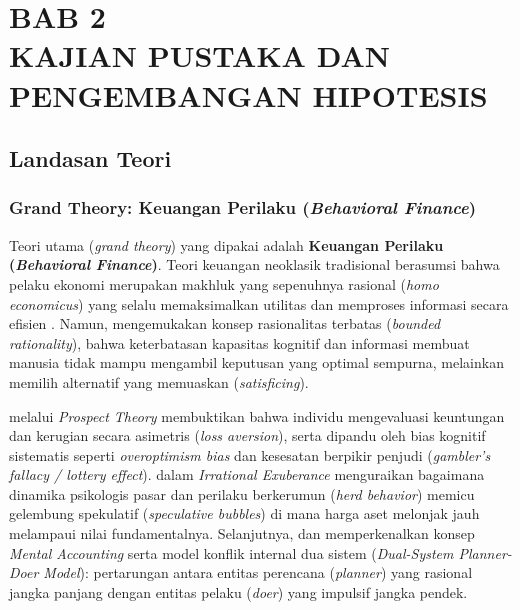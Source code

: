 \documentclass[12pt,a4paper]{article}
\numberwithin{equation}{section}
\numberwithin{table}{section}
\numberwithin{figure}{section}
\begin{document}
\newpage
\setcounter{section}{1}
\section*{BAB 2\\[0.3cm]KAJIAN PUSTAKA DAN PENGEMBANGAN HIPOTESIS}
\setcounter{section}{2}
\setcounter{subsection}{0}
\setcounter{table}{0}
\setcounter{figure}{0}
\setcounter{equation}{0}

\subsection{Landasan Teori}

\subsubsection{Grand Theory: Keuangan Perilaku (\emph{Behavioral Finance})}

Teori utama (\emph{grand theory}) yang dipakai adalah \textbf{Keuangan Perilaku (\emph{Behavioral Finance})}. Teori keuangan neoklasik tradisional berasumsi bahwa pelaku ekonomi merupakan makhluk yang sepenuhnya rasional (\emph{homo economicus}) yang selalu memaksimalkan utilitas dan memproses informasi secara efisien \citep{fama1970efficient}. Namun, \citet{simon1955behavioral} mengemukakan konsep rasionalitas terbatas (\emph{bounded rationality}), bahwa keterbatasan kapasitas kognitif dan informasi membuat manusia tidak mampu mengambil keputusan yang optimal sempurna, melainkan memilih alternatif yang memuaskan (\emph{satisficing}).

\citet{kahneman1979prospect} melalui \emph{Prospect Theory} membuktikan bahwa individu mengevaluasi keuntungan dan kerugian secara asimetris (\emph{loss aversion}), serta dipandu oleh bias kognitif sistematis seperti \emph{overoptimism bias} dan kesesatan berpikir penjudi (\emph{gambler's fallacy / lottery effect}). \citet{shiller2000irrational} dalam \emph{Irrational Exuberance} menguraikan bagaimana dinamika psikologis pasar dan perilaku berkerumun (\emph{herd behavior}) memicu gelembung spekulatif (\emph{speculative bubbles}) di mana harga aset melonjak jauh melampaui nilai fundamentalnya. Selanjutnya, \citet{thaler1985mental} dan \citet{thaler1981economic} memperkenalkan konsep \emph{Mental Accounting} serta model konflik internal dua sistem (\emph{Dual-System Planner-Doer Model}): pertarungan antara entitas perencana (\emph{planner}) yang rasional jangka panjang dengan entitas pelaku (\emph{doer}) yang impulsif jangka pendek.
\end{document}
